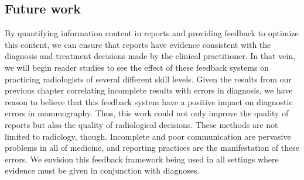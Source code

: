 \subsection{Future work}
By quantifying information content in reports and providing feedback to optimize this content, we can ensure that reports have evidence consistent with the diagnosis and treatment decisions made by the clinical practitioner.
In that vein, we will begin reader studies to see the effect of these feedback systems on practicing radiologists of several different skill levels.
Given the results from our previous chapter correlating incomplete results with errors in diagnosis, we have reason to believe that this feedback system have a positive impact on diagnostic errors in mammography.
Thus, this work could not only improve the quality of reports but also the quality of radiological decisions.
These methods are not limited to radiology, though.
Incomplete and poor communication are pervasive problems in all of medicine, and reporting practices are the manifestation of these errors.
We envision this feedback framework being used in all settings where evidence must be given in conjunction with diagnoses.

 
 



 
